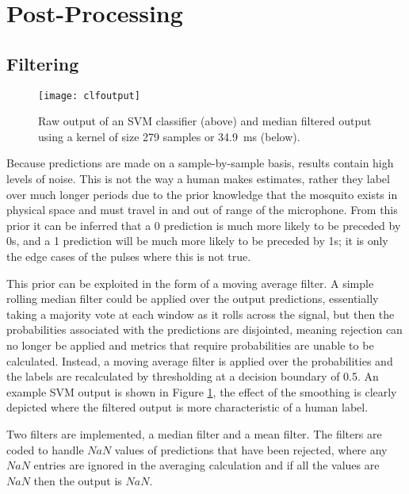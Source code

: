 \section{Post-Processing}
\label{sec:pl-postproc}
    \subsection{Filtering}
    \label{subsec:pl-postproc-filt}
        \begin{figure}[ht]
            \centering
            \texttt{[image: clfoutput]}
            \caption{Raw output of an SVM classifier (above) and median filtered output using a kernel of size 279 samples or \SI{34.9}{\milli\second} (below).}
            \label{fig:epl-postproc-filt-output}
        \end{figure}
        Because predictions are made on a sample-by-sample basis, results contain high levels of noise. This is not the way a human makes estimates, rather they label over much longer periods due to the prior knowledge that the mosquito exists in physical space and must travel in and out of range of the microphone. From this prior it can be inferred that a 0 prediction is much more likely to be preceded by 0s, and a 1 prediction will be much more likely to be preceded by 1s; it is only the edge cases of the pulses where this is not true. 
        
        This prior can be exploited in the form of a moving average filter. A simple rolling median filter could be applied over the output predictions, essentially taking a majority vote at each window as it rolls across the signal, but then the probabilities associated with the predictions are disjointed, meaning rejection can no longer be applied and metrics that require probabilities are unable to be calculated. Instead, a moving average filter is applied over the probabilities and the labels are recalculated by thresholding at a decision boundary of 0.5. An example SVM output is shown in Figure \ref{fig:epl-postproc-filt-output}, the effect of the smoothing is clearly depicted where the filtered output is more characteristic of a human label. 
        
        Two filters are implemented, a median filter and a mean filter. The filters are coded to handle $NaN$ values of predictions that have been rejected, where any $NaN$ entries are ignored in the averaging calculation and if all the values are $NaN$ then the output is $NaN$.
        
